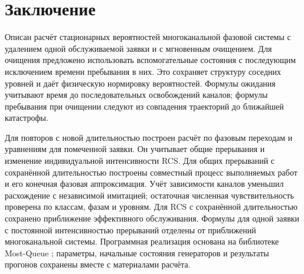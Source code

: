 \documentclass[a4paper,12pt]{article}
\begin{document}
\FloatBarrier
\section{Заключение}
Описан расчёт стационарных вероятностей многоканальной фазовой системы с удалением одной обслуживаемой заявки и с мгновенным очищением. Для очищения предложено использовать вспомогательные состояния с последующим исключением времени пребывания в них. Это сохраняет структуру соседних уровней и даёт физическую нормировку вероятностей. Формулы ожидания учитывают время до последовательных освобождений каналов; формулы пребывания при очищении следуют из совпадения траекторий до ближайшей катастрофы.

Для повторов с новой длительностью построен расчёт по фазовым переходам и уравнениям для помеченной заявки. Он учитывает общие прерывания и изменение индивидуальной интенсивности RCS. Для общих прерываний с сохранённой длительностью построены совместный процесс выполняемых работ и его конечная фазовая аппроксимация. Учёт зависимости каналов уменьшил расхождение с независимой имитацией; остаточная численная чувствительность проверена по классам, фазам и уровням. Для RCS с сохранённой длительностью сохранено приближение эффективного обслуживания. Формулы для одной заявки с постоянной интенсивностью прерываний отделены от приближений многоканальной системы. Программная реализация основана на библиотеке Most-Queue \cite{mostqueue2026}; параметры, начальные состояния генераторов и результаты прогонов сохранены вместе с материалами расчёта.

\printbibliography
\end{document}
